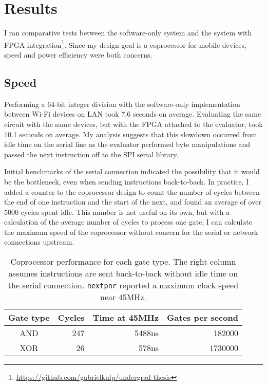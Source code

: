 \section{Results}
I ran comparative tests between the software-only system and the system with FPGA integration\footnote{\url{https://github.com/gabrielkulp/undergrad-thesis}}. Since my design goal is a coprocessor for mobile devices, speed and power efficiency were both concerns.

\subsection{Speed}
Performing a 64-bit integer division with the software-only implementation between Wi-Fi devices on LAN took 7.6 seconds on average. Evaluating the same circuit with the same devices, but with the FPGA attached to the evaluator, took 10.1 seconds on average. My analysis suggests that this slowdown occurred from idle time on the serial line as the evaluator performed byte manipulations and passed the next instruction off to the SPI serial library.

Initial benchmarks of the serial connection indicated the possibility that it would be the bottleneck, even when sending instructions back-to-back. In practice, I added a counter to the coprocessor design to count the number of cycles between the end of one instruction and the start of the next, and found an average of over 5000 cycles spent idle. This number is not useful on its own, but with a calculation of the average number of cycles to process one gate, I can calculate the maximum speed of the coprocessor without concern for the serial or network connections upstream.

\begin{table}[ht]
	\centering
	\begin{tabular}{c r r r}
		\toprule
		Gate type & Cycles & Time at 45MHz & Gates per second\\
		\midrule
		AND       &    247 &        5488ns &  182000\\
		XOR       &     26 &         578ns & 1730000\\
		\bottomrule
	\end{tabular}
	\caption{Coprocessor performance for each gate type. The right column assumes instructions are sent back-to-back without idle time on the serial connection. \texttt{nextpnr} reported a maximum clock speed near 45MHz.}%
	\label{tab:perf}
\end{table}

